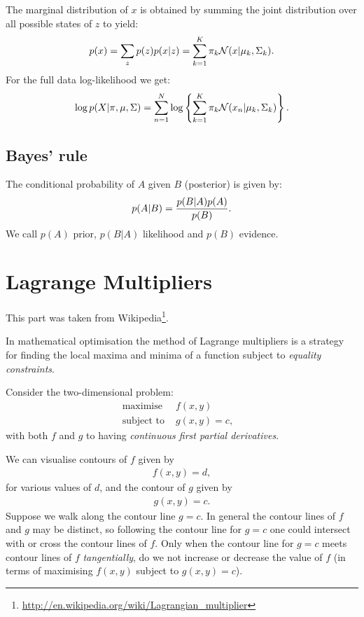 The marginal distribution of $x$ is obtained by summing the joint distribution over all possible states of $z$ to yield:
\begin{align*}
    p(x) = \sum_z p(z)p(x|z) = \sum_{k=1}^K \pi_k \mathcal N(x|\mu_k, \Sigma_k).
\end{align*}
For the full data log-likelihood we get:
\begin{align*}
    \log p(X|\pi, \mu, \Sigma) = \sum_{n=1}^N \log \left\{\sum_{k=1}^K \pi_k \mathcal N(x_n|\mu_k, \Sigma_k)\right\}.
\end{align*}

\subsection{Bayes' rule}
The conditional probability of $A$ given $B$ (posterior) is given by:
\begin{align*}
    p(A|B) = {p(B|A)p(A)\over p(B)}.
\end{align*}
We call $p(A)$ prior, $p(B|A)$ likelihood and $p(B)$ evidence.


\section{Lagrange Multipliers}
This part was taken from Wikipedia\footnote{\url{http://en.wikipedia.org/wiki/Lagrangian_multiplier}}.

In mathematical optimisation the method of Lagrange multipliers is a strategy for finding the local maxima and minima of a function subject to \emph{equality constraints}.

Consider the two-dimensional problem:
\begin{align*}
    \text{maximise } &f(x,y)&\\
    \text{subject to } &g(x,y)=c,
\end{align*}
with both $f$ and $g$ to having \emph{continuous first partial derivatives}. 


We can visualise contours of $f$ given by
\begin{align*}
    f(x,y) = d,
\end{align*}
for various values of $d$, and the contour of $g$ given by
\begin{align*}
    g(x,y) = c.
\end{align*}
Suppose we walk along the contour line $g=c$. In general the contour lines of $f$ and $g$ may be distinct, so following the contour line for $g=c$ one could intersect with or cross the contour lines of $f$.
Only when the contour line for $g=c$ meets contour lines of $f$ \emph{tangentially}, do we not increase or decrease the value of $f$ (in terms of maximising $f(x,y)$ subject to $g(x,y)=c$).  

